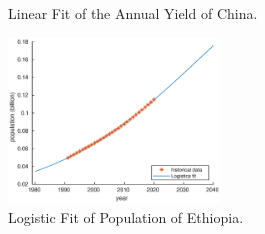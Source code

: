 \documentclass[12pt]{article}
\begin{document}
\begin{appendices}
\begin{figure}[htbp]
\begin{minipage}[t]{0.48\textwidth}
        \caption{Linear Fit of the Annual Yield of China.}
    \end{minipage}
\end{figure}
\begin{figure}
    \centering
    \includegraphics[width = 0.5\textwidth]{figure/model/Ethiopia/Ethiopia_pplt.eps}
    \caption{Logistic Fit of Population of Ethiopia.}
\end{figure}


\end{appendices}
\end{document}
